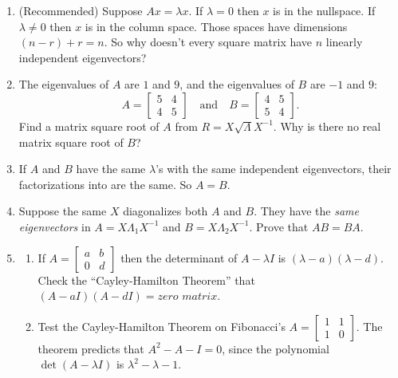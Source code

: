 \documentclass[14pt, a4paper]{article}
\begin{document}
\begin{enumerate}[resume]
    \item (Recommended) Suppose $Ax = \lambda x$. If $\lambda = 0$ then $x$ is in the nullspace. If $\lambda \neq 0$ then $x$ is in the column space. Those spaces have dimensions $(n - r) + r = n$. So why doesn't every square matrix have $n$ linearly independent eigenvectors?

    \item The eigenvalues of $A$ are $1$ and $9$, and the eigenvalues of $B$ are $-1$ and $9$:
          \[
              A = \begin{bmatrix} 5 & 4 \\ 4 & 5 \end{bmatrix} \quad \text{and} \quad B = \begin{bmatrix} 4 & 5 \\ 5 & 4 \end{bmatrix} .
          \]
          Find a matrix square root of $A$ from $R = X\sqrt{\Lambda}X^{-1}$. Why is there no real matrix square root of $B$?

    \item If $A$ and $B$ have the same $\lambda$'s with the same independent eigenvectors, their factorizations into \underline{\hspace{1cm}} are the same. So $A = B$.

    \item Suppose the same $X$ diagonalizes both $A$ and $B$. They have the \textit{same eigenvectors} in $A = X\Lambda_1 X^{-1}$ and $B = X\Lambda_2 X^{-1}$. Prove that $AB = BA$.

    \item
          \begin{enumerate}
              \item If $A = \begin{bmatrix} a & b \\ 0 & d \end{bmatrix}$ then the determinant of $A - \lambda I$ is $(\lambda - a)(\lambda - d)$. Check the ``Cayley-Hamilton Theorem'' that $(A - aI)(A - dI) = \textit{zero matrix}$.
              \item Test the Cayley-Hamilton Theorem on Fibonacci's $A = \begin{bmatrix} 1 & 1 \\ 1 & 0 \end{bmatrix}$. The theorem predicts that $A^2 - A - I = 0$, since the polynomial $\det(A - \lambda I)$ is $\lambda^2 - \lambda - 1$.
          \end{enumerate}


\end{enumerate}
\end{document}
